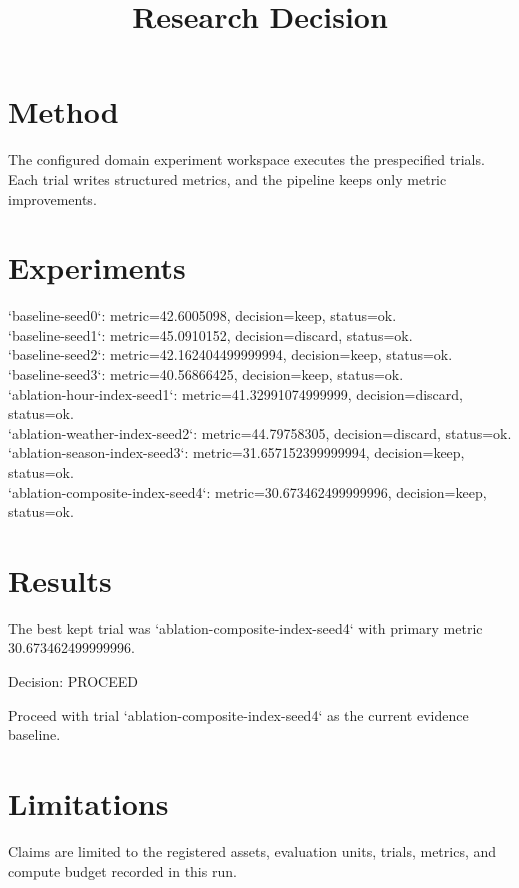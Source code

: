 \documentclass{article}
\begin{document}
\section{Method}
The configured domain experiment workspace executes the prespecified trials.
Each trial writes structured metrics, and the pipeline keeps only metric improvements.

\section{Experiments}
\noindent `baseline-seed0`: metric=42.6005098, decision=keep, status=ok.\\
\noindent `baseline-seed1`: metric=45.0910152, decision=discard, status=ok.\\
\noindent `baseline-seed2`: metric=42.162404499999994, decision=keep, status=ok.\\
\noindent `baseline-seed3`: metric=40.56866425, decision=keep, status=ok.\\
\noindent `ablation-hour-index-seed1`: metric=41.32991074999999, decision=discard, status=ok.\\
\noindent `ablation-weather-index-seed2`: metric=44.79758305, decision=discard, status=ok.\\
\noindent `ablation-season-index-seed3`: metric=31.657152399999994, decision=keep, status=ok.\\
\noindent `ablation-composite-index-seed4`: metric=30.673462499999996, decision=keep, status=ok.\\

\section{Results}
The best kept trial was `ablation-composite-index-seed4` with primary metric 30.673462499999996.
\title{Research Decision}
\maketitle

Decision: PROCEED

Proceed with trial `ablation-composite-index-seed4` as the current evidence baseline.

\section{Limitations}
Claims are limited to the registered assets, evaluation units, trials, metrics, and compute budget recorded in this run.
\end{document}
